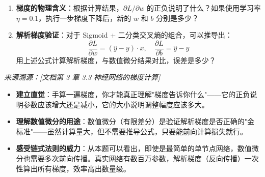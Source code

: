 \documentclass[a4paper,11pt]{ctexart}
\begin{document}
\begin{problembox}
\begin{enumerate}[(1)]
        \item \textbf{梯度的物理含义}：根据计算结果，$\partial L / \partial w$ 的正负说明了什么？如果使用学习率 $\eta = 0.1$，执行一步梯度下降后，新的 $w$ 和 $b$ 分别是多少？

        \item \textbf{解析梯度验证}：对于 Sigmoid + 二分类交叉熵的组合，可以推导出：
        \[
        \frac{\partial L}{\partial w} = (\hat{y} - y) \cdot x, \quad \frac{\partial L}{\partial b} = \hat{y} - y
        \]
        用上述公式计算解析梯度，与数值微分结果对比，误差是多少？
    \end{enumerate}

    \vspace{0.2cm}
    {\color{gray}\small\textit{来源溯源：[文档第 3 章 3.3 神经网络的梯度计算]}}
\end{problembox}

\begin{beginnerbox}
    \begin{itemize}
        \item \textbf{建立直觉}：手算一遍梯度，你才能真正理解"梯度告诉你什么"——它的正负说明参数应该增大还是减小，它的大小说明调整幅度应该多大。
        \item \textbf{理解数值微分的用途}：数值微分（有限差分）是验证解析梯度是否正确的"金标准"——虽然计算量大，但不需要推导公式，只要能前向计算损失就行。
        \item \textbf{感受链式法则的威力}：从本题可以看出，即使是最简单的单节点网络，数值微分也需要多次前向传播。真实网络有数百万参数，解析梯度（反向传播）一次性算出所有梯度，效率高出数量级。
    \end{itemize}
\end{beginnerbox}
\end{document}
